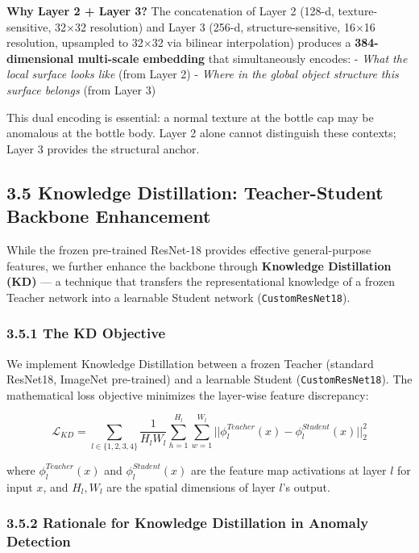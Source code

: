 \documentclass[12pt, a4paper, oneside]{report}
\begin{document}
\textbf{Why Layer 2 + Layer 3?} The concatenation of Layer 2 (128-d, texture-sensitive, 32$\times$32 resolution) and Layer 3 (256-d, structure-sensitive, 16$\times$16 resolution, upsampled to 32$\times$32 via bilinear interpolation) produces a \textbf{384-dimensional multi-scale embedding} that simultaneously encodes: - \emph{What the local surface looks like} (from Layer 2) - \emph{Where in the global object structure this surface belongs} (from Layer 3)

This dual encoding is essential: a normal texture at the bottle cap may be anomalous at the bottle body. Layer 2 alone cannot distinguish these contexts; Layer 3 provides the structural anchor.

\bigskip\noindent\hrulefill\bigskip

\subsection{3.5 Knowledge Distillation: Teacher-Student Backbone Enhancement}\label{knowledge-distillation-teacher-student-backbone-enhancement}

While the frozen pre-trained ResNet-18 provides effective general-purpose features, we further enhance the backbone through \textbf{Knowledge Distillation (KD)} --- a technique that transfers the representational knowledge of a frozen Teacher network into a learnable Student network (\texttt{CustomResNet18}).

\subsubsection{3.5.1 The KD Objective}\label{the-kd-objective}

We implement Knowledge Distillation between a frozen Teacher (standard ResNet18, ImageNet pre-trained) and a learnable Student (\texttt{CustomResNet18}). The mathematical loss objective minimizes the layer-wise feature discrepancy:

\[ \mathcal{L}_{KD} = \sum_{l \in \{1,2,3,4\}} \frac{1}{H_l W_l} \sum_{h=1}^{H_l} \sum_{w=1}^{W_l} || \phi_l^{Teacher}(x) - \phi_l^{Student}(x) ||_2^2 \]

where \(\phi_l^{Teacher}(x)\) and \(\phi_l^{Student}(x)\) are the feature map activations at layer \(l\) for input \(x\), and \(H_l, W_l\) are the spatial dimensions of layer \(l\)'s output.

\subsubsection{3.5.2 Rationale for Knowledge Distillation in Anomaly Detection}\label{rationale-for-knowledge-distillation-in-anomaly-detection}
\end{document}
